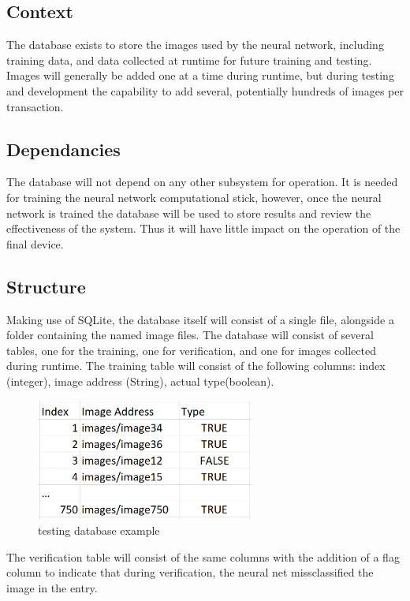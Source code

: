\subsection{Context}
The database exists to store the images used by the neural network, including training data, and data collected at runtime for future training and testing. Images will generally be added one at a time during runtime, but during testing and development the capability to add several, potentially hundreds of images per transaction.

\subsection{Dependancies} 
The database will not depend on any other subsystem for operation. It is needed for training the neural network computational stick, however, once the neural network is trained the database will be used to store results and review the effectiveness of the system. Thus it will have little impact on the operation of the final device.

\subsection{Structure}
Making use of SQLite, the database itself will consist of a single file, alongside a folder containing the named image files. 
The database will consist of several tables, one for the training, one for verification, and one for images collected during runtime. 
The training table will consist of the following columns: index (integer), image address (String), actual type(boolean). 

\begin{figure}[h]
\caption{testing database example}
\centering
\includegraphics[height=4cm]{testingdb}
\end{figure}

The verification table will consist of the same columns with the addition of a flag column to indicate that during verification, the neural net missclassified the image in the entry. 

